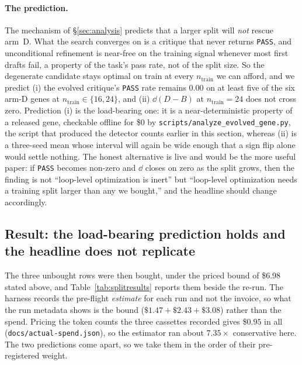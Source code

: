 \documentclass[11pt]{article}
\begin{document}
\paragraph{The prediction.} The mechanism of \S\ref{sec:analysis} predicts that a larger split
will \emph{not} rescue arm~D. What the search converges on is a critique that never returns
\texttt{PASS}, and unconditional refinement is near-free on the training signal whenever most
first drafts fail, a property of the task's pass rate, not of the split size. So the
degenerate candidate stays optimal on train at every $n_{\mathrm{train}}$ we can afford, and
we predict (i) the evolved critique's \texttt{PASS} rate remains $0.00$ on at least five of the
six arm-D genes at $n_{\mathrm{train}} \in \{16, 24\}$, and (ii) $\dd(D-B)$ at
$n_{\mathrm{train}}{=}24$ does not cross zero. Prediction (i) is the load-bearing one: it is a
near-deterministic property of a released gene, checkable offline for \$0 by
\texttt{scripts/analyze\_evolved\_gene.py}, the script that produced the detector counts
earlier in this section, whereas (ii) is a three-seed mean whose interval will
again be wide enough that a sign flip alone would settle nothing. The honest alternative is
live and would be the more useful paper: if \texttt{PASS} becomes non-zero and $\dd$ closes on
zero as the split grows, then the finding is not ``loop-level optimization is inert'' but
``loop-level optimization needs a training split larger than any we bought,'' and the headline
should change accordingly.

\subsection{Result: the load-bearing prediction holds and the headline does not replicate}
\label{sec:splitresult}

The three unbought rows were then bought, under the priced bound of \$6.98 stated above, and
Table~\ref{tab:splitresults} reports them beside the re-run. The harness records the pre-flight
\emph{estimate} for each run and not the invoice, so what the run metadata shows is the
bound ($\$1.47 + \$2.43 + \$3.08$) rather than the spend. Pricing the token counts the three
cassettes recorded gives \$$0.95$ in all (\texttt{docs/actual-spend.json}), so the estimator ran
about $7.35\times$ conservative here. The two predictions come apart, so we take them in the order
of their pre-registered weight.
\end{document}
